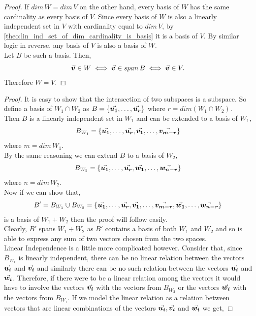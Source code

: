 \documentclass[MathsNotesBase.tex]{subfiles}
\begin{document}
{\begin{proof}
		If ${ dim\,W = dim\,V }$ on the other hand, every basis of $W$ has the same cardinality as every basis of $V$. Since every basis of $W$ is also a linearly independent set in $V$ with cardinality equal to ${ dim\,V }$, by \autoref{theo:lin_ind_set_of_dim_cardinality_is_basis} it is a basis of $V$. By similar logic in reverse, any basis of $V$ is also a basis of $W$.\\
		Let $B$ be such a basis. Then,
		\[ \vec{\bm{v}} \in W \iff \vec{\bm{v}} \in span\,B \iff \vec{\bm{v}} \in V. \]
		Therefore ${ W = V }$.
	\end{proof}

	\medskip
	\begin{proof}
		It is easy to show that the intersection of two subspaces is a subspace. So define a basis of ${ W_1 \cap W_2 }$ as ${ B = \{\vec{\bm{u_1}}, \dots, \vec{\bm{u_r}}\} }$ where ${ r = dim(W_1 \cap W_2) }$.\\
		Then $B$ is a linearly independent set in $W_1$ and can be extended to a basis of $W_1$,
		\[ B_{W_1} = \{\vec{\bm{u_1}}, \dots, \vec{\bm{u_r}}, \vec{\bm{v_1}}, \dots, \vec{\bm{v_{m-r}}}\} \]
		where ${ m = dim\,W_1 }$.\\
		By the same reasoning we can extend $B$ to a basis of $W_2$,
		\[ B_{W_2} = \{\vec{\bm{u_1}}, \dots, \vec{\bm{u_r}}, \vec{\bm{w_1}}, \dots, \vec{\bm{w_{n-r}}}\} \]
		where ${ n = dim\,W_2 }$.\\
		Now if we can show that,
		\[ B' = B_{W_1} \cup B_{W_2} = \{ \vec{\bm{u_1}}, \dots, \vec{\bm{u_r}}, \vec{\bm{v_1}}, \dots, \vec{\bm{v_{m-r}}}, \vec{\bm{w_1}}, \dots, \vec{\bm{w_{n-r}}} \} \]
		is a basis of ${ W_1 + W_2 }$ then the proof will follow easily.\\
		Clearly, $B'$ spans ${ W_1 + W_2 }$ as $B'$ contains a basis of both $W_1$ and $W_2$ and so is able to express any sum of two vectors chosen from the two spaces.\\
		Linear Independence is a little more complicated however. Consider that, since $B_{W_1}$ is linearly independent, there can be no linear relation between the vectors $\vec{\bm{u_i}}$ and $\vec{\bm{v_i}}$ and similarly there can be no such relation between the vectors $\vec{\bm{u_i}}$ and $\vec{\bm{w_i}}$. Therefore, if there were to be a linear relation among the vectors it would have to involve the vectors $\vec{\bm{v_i}}$ with the vectors from $B_{W_2}$ or the vectors $\vec{\bm{w_i}}$ with the vectors from $B_{W_1}$. If we model the linear relation as a relation between vectors that are linear combinations of the vectors $\vec{\bm{u_i}}, \vec{\bm{v_i}}$ and $\vec{\bm{w_i}}$ we get,

\end{proof}}
\end{document}
